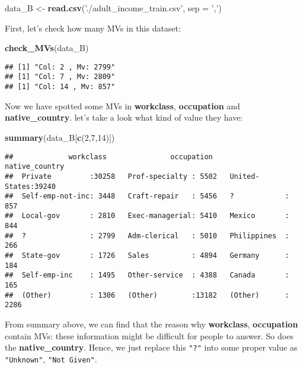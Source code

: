 \documentclass[]{article}
\newenvironment{Shaded}{\begin{snugshade}}{\end{snugshade}}
\newcommand{\KeywordTok}[1]{\textcolor[rgb]{0.13,0.29,0.53}{\textbf{#1}}}
\newcommand{\DataTypeTok}[1]{\textcolor[rgb]{0.13,0.29,0.53}{#1}}
\newcommand{\DecValTok}[1]{\textcolor[rgb]{0.00,0.00,0.81}{#1}}
\newcommand{\StringTok}[1]{\textcolor[rgb]{0.31,0.60,0.02}{#1}}
\newcommand{\NormalTok}[1]{#1}
\begin{document}
\begin{Shaded}
\begin{Highlighting}[]
\NormalTok{data_B <-}\StringTok{ }\KeywordTok{read.csv}\NormalTok{(}\StringTok{'./adult_income_train.csv'}\NormalTok{, }\DataTypeTok{sep =} \StringTok{','}\NormalTok{)}
\end{Highlighting}
\end{Shaded}

First, let's check how many MVs in this dataset:

\begin{Shaded}
\begin{Highlighting}[]
\KeywordTok{check_MVs}\NormalTok{(data_B)}
\end{Highlighting}
\end{Shaded}

\begin{verbatim}
## [1] "Col: 2 , Mv: 2799"
## [1] "Col: 7 , Mv: 2809"
## [1] "Col: 14 , Mv: 857"
\end{verbatim}

Now we have spotted some MVs in \textbf{workclass}, \textbf{occupation}
and \textbf{native\_country}. let's take a look what kind of value they
have:

\begin{Shaded}
\begin{Highlighting}[]
\KeywordTok{summary}\NormalTok{(data_B[}\KeywordTok{c}\NormalTok{(}\DecValTok{2}\NormalTok{,}\DecValTok{7}\NormalTok{,}\DecValTok{14}\NormalTok{)])}
\end{Highlighting}
\end{Shaded}

\begin{verbatim}
##             workclass               occupation          native_country 
##  Private         :30258   Prof-specialty : 5502   United-States:39240  
##  Self-emp-not-inc: 3448   Craft-repair   : 5456   ?            :  857  
##  Local-gov       : 2810   Exec-managerial: 5410   Mexico       :  844  
##  ?               : 2799   Adm-clerical   : 5010   Philippines  :  266  
##  State-gov       : 1726   Sales          : 4894   Germany      :  184  
##  Self-emp-inc    : 1495   Other-service  : 4388   Canada       :  165  
##  (Other)         : 1306   (Other)        :13182   (Other)      : 2286
\end{verbatim}

From summary above, we can find that the reason why \textbf{workclass},
\textbf{occupation} contain MVs: these information might be difficult
for people to answer. So does the \textbf{native\_country}. Hence, we
just replace this \texttt{"?"} into some proper value as
\texttt{"Unknown"}, \texttt{"Not\ Given"}.
\end{document}
